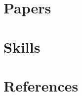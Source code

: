 \documentclass{prometheus_cv}
\begin{document}
\section{Papers}


\section{Skills}


\section{References}

\end{document}
